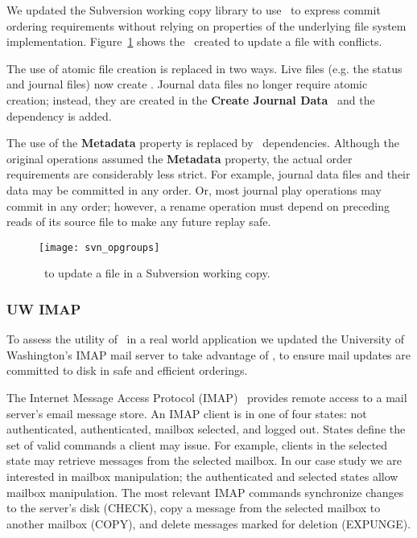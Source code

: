 We updated the Subversion working copy library to use \opgroups\ to
express commit ordering requirements without relying on properties of the
underlying file system implementation.
%
Figure~\ref{fig:svn-order} shows the \opgroups\ created to update a
file with conflicts.

The use of atomic file creation is replaced in two ways.
%
Live files (e.g. the status and journal files) now create
.
%
Journal data files no longer require atomic creation; instead, they
are created in the \textbf{Create Journal Data} \opgroup\ and the
dependency is added.

The use of the \textbf{Metadata} property is replaced by \opgroup\
dependencies.
%
Although the original operations assumed the \textbf{Metadata}
property, the actual order requirements are considerably less strict.
%
For example, journal data files and their data may be committed in any
order.
%
Or, most journal play operations may commit in any order; however, a
rename operation must depend on preceding reads of its source file to
make any future replay safe.

\begin{figure}[htb]
  \centering
  \texttt{[image: svn\_opgroups]}
  \caption{\Opgroups\ to update a file in a Subversion working copy.}
  \label{fig:svn-order}
\end{figure}

\subsubsection{UW IMAP}
\label{sec:opgroup:uwimap}

To assess the utility of \opgroups\ in a real world application we
updated the University of Washington's IMAP mail server to take
advantage of \opgroups, to ensure mail updates are committed to disk
in safe and efficient orderings.

The Internet Message Access Protocol (IMAP)~\cite{rfc3501} provides
remote access to a mail server's email message store. An IMAP client
is in one of four states: not authenticated, authenticated, mailbox
selected, and logged out. States define the set of valid commands a
client may issue. For example, clients in the selected state may
retrieve messages from the selected mailbox. In our case study we are
interested in mailbox manipulation; the authenticated and selected
states allow mailbox manipulation. The most relevant IMAP commands
synchronize changes to the server's disk (CHECK), copy a message from
the selected mailbox to another mailbox (COPY), and delete messages
marked for deletion (EXPUNGE).

